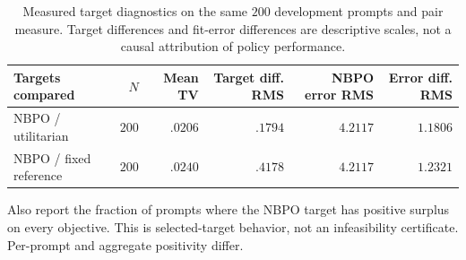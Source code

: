 \documentclass{article}
\theoremstyle{remark}
\theoremstyle{plain}
\begin{document}
\begin{table}[htbp]
\centering\scriptsize
\setlength{\tabcolsep}{5pt}
\caption{Measured target diagnostics on the same $200$ development prompts and pair measure. Target differences and fit-error differences are descriptive scales, not a causal attribution of policy performance.}
\label{tab:target-signal}
\begin{tabular}{lrrrrr}
\toprule
Targets compared & $N$ & Mean TV & Target diff. RMS & NBPO error RMS & Error diff. RMS\\
\midrule
NBPO / utilitarian & $200$ & $.0206$ & $.1794$ & $4.2117$ & $1.1806$\\
NBPO / fixed reference & $200$ & $.0240$ & $.4178$ & $4.2117$ & $1.2321$\\
\bottomrule
\end{tabular}
\end{table}
Also report the fraction of prompts where the NBPO target has positive surplus on every objective. This is selected-target behavior, not an infeasibility certificate. Per-prompt and aggregate positivity differ.



\end{document}
